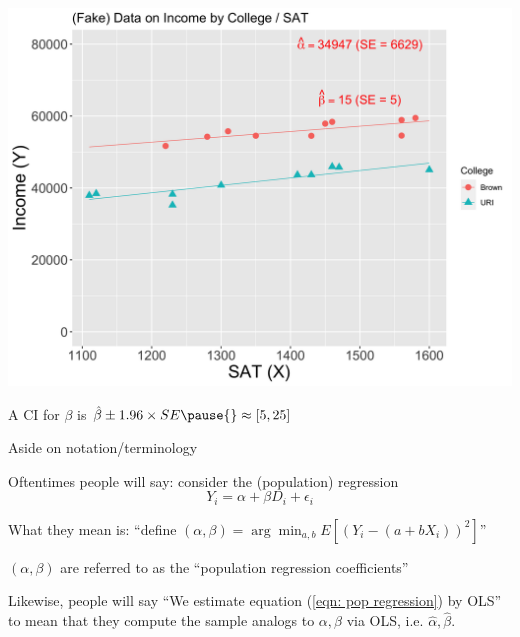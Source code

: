 \documentclass[11pt,english,handout]{beamer}
\newenvironment{wideitemize}{\itemize\addtolength{\itemsep}{10pt}}{\enditemize}
\begin{document}
		
\begin{frame}
	\centering
\includegraphics[width = 0.8\linewidth]{fake-sat-with-trend-brown-betas-plus-ses.png}

\pause

\begin{wideitemize}
	\item
	A CI for $\beta$ is $\hat\beta \pm 1.96 \times SE \pause{} \approx [5,25]$
\end{wideitemize}
\end{frame}		
		
\begin{frame}{Aside on notation/terminology}
\begin{wideitemize}
	\item
	Oftentimes people will say: consider the (population) regression
	\begin{equation}
		Y_i = \alpha + \beta D_i + \epsilon_i \label{eqn: pop regression}
	\end{equation}	

	\item
	What they mean is: ``define $(\alpha,\beta) = \arg\min_{a,b} E[ (Y_i - (a + b X_i))^2 ]$''
	
	\item
	$(\alpha,\beta)$ are referred to as the ``population regression coefficients''
	
	\pause
	\item
	Likewise, people will say ``We estimate equation (\ref{eqn: pop regression}) by OLS'' to mean that they compute the sample analogs to $\alpha,\beta$ via OLS, i.e. $\hat\alpha, \hat\beta$.  
\end{wideitemize}
	
\end{frame}		
		
\end{document}
